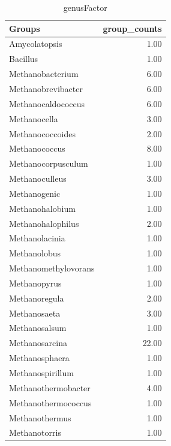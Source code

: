 \documentclass{article}
\begin{document}
\begin{table}[ht]
\centering
\begin{tabular}{lr}
  \hline
Groups & group\_counts \\ 
  \hline
Amycolatopsis & 1.00 \\ 
  Bacillus & 1.00 \\ 
  Methanobacterium & 6.00 \\ 
  Methanobrevibacter & 6.00 \\ 
  Methanocaldococcus & 6.00 \\ 
  Methanocella & 3.00 \\ 
  Methanococcoides & 2.00 \\ 
  Methanococcus & 8.00 \\ 
  Methanocorpusculum & 1.00 \\ 
  Methanoculleus & 3.00 \\ 
  Methanogenic & 1.00 \\ 
  Methanohalobium & 1.00 \\ 
  Methanohalophilus & 2.00 \\ 
  Methanolacinia & 1.00 \\ 
  Methanolobus & 1.00 \\ 
  Methanomethylovorans & 1.00 \\ 
  Methanopyrus & 1.00 \\ 
  Methanoregula & 2.00 \\ 
  Methanosaeta & 3.00 \\ 
  Methanosalsum & 1.00 \\ 
  Methanosarcina & 22.00 \\ 
  Methanosphaera & 1.00 \\ 
  Methanospirillum & 1.00 \\ 
  Methanothermobacter & 4.00 \\ 
  Methanothermococcus & 1.00 \\ 
  Methanothermus & 1.00 \\ 
  Methanotorris & 1.00 \\ 
   \hline
\end{tabular}
\caption{genusFactor} 
\label{tab:genusFactor}
\end{table}
\end{document}
